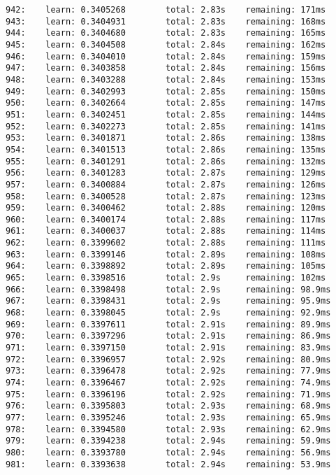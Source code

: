 \documentclass[11pt]{article}
\begin{document}
\begin{Verbatim}[commandchars=\\\{\}]
942:    learn: 0.3405268        total: 2.83s    remaining: 171ms
943:    learn: 0.3404931        total: 2.83s    remaining: 168ms
944:    learn: 0.3404680        total: 2.83s    remaining: 165ms
945:    learn: 0.3404508        total: 2.84s    remaining: 162ms
946:    learn: 0.3404010        total: 2.84s    remaining: 159ms
947:    learn: 0.3403858        total: 2.84s    remaining: 156ms
948:    learn: 0.3403288        total: 2.84s    remaining: 153ms
949:    learn: 0.3402993        total: 2.85s    remaining: 150ms
950:    learn: 0.3402664        total: 2.85s    remaining: 147ms
951:    learn: 0.3402451        total: 2.85s    remaining: 144ms
952:    learn: 0.3402273        total: 2.85s    remaining: 141ms
953:    learn: 0.3401871        total: 2.86s    remaining: 138ms
954:    learn: 0.3401513        total: 2.86s    remaining: 135ms
955:    learn: 0.3401291        total: 2.86s    remaining: 132ms
956:    learn: 0.3401283        total: 2.87s    remaining: 129ms
957:    learn: 0.3400884        total: 2.87s    remaining: 126ms
958:    learn: 0.3400528        total: 2.87s    remaining: 123ms
959:    learn: 0.3400462        total: 2.88s    remaining: 120ms
960:    learn: 0.3400174        total: 2.88s    remaining: 117ms
961:    learn: 0.3400037        total: 2.88s    remaining: 114ms
962:    learn: 0.3399602        total: 2.88s    remaining: 111ms
963:    learn: 0.3399146        total: 2.89s    remaining: 108ms
964:    learn: 0.3398892        total: 2.89s    remaining: 105ms
965:    learn: 0.3398516        total: 2.9s     remaining: 102ms
966:    learn: 0.3398498        total: 2.9s     remaining: 98.9ms
967:    learn: 0.3398431        total: 2.9s     remaining: 95.9ms
968:    learn: 0.3398045        total: 2.9s     remaining: 92.9ms
969:    learn: 0.3397611        total: 2.91s    remaining: 89.9ms
970:    learn: 0.3397296        total: 2.91s    remaining: 86.9ms
971:    learn: 0.3397150        total: 2.91s    remaining: 83.9ms
972:    learn: 0.3396957        total: 2.92s    remaining: 80.9ms
973:    learn: 0.3396478        total: 2.92s    remaining: 77.9ms
974:    learn: 0.3396467        total: 2.92s    remaining: 74.9ms
975:    learn: 0.3396196        total: 2.92s    remaining: 71.9ms
976:    learn: 0.3395803        total: 2.93s    remaining: 68.9ms
977:    learn: 0.3395246        total: 2.93s    remaining: 65.9ms
978:    learn: 0.3394580        total: 2.93s    remaining: 62.9ms
979:    learn: 0.3394238        total: 2.94s    remaining: 59.9ms
980:    learn: 0.3393780        total: 2.94s    remaining: 56.9ms
981:    learn: 0.3393638        total: 2.94s    remaining: 53.9ms

\end{Verbatim}
\end{document}
